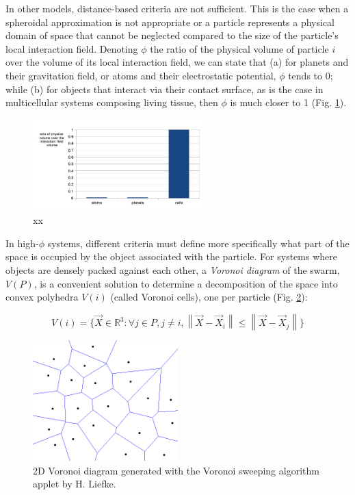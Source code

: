 In other models, distance-based criteria are not sufficient. This is the case when a spheroidal approximation is not appropriate or a particle represents a physical domain of space that cannot be neglected compared to the size of the particle's local interaction field. Denoting $\phi$ the ratio of the physical volume of particle $i$ over the volume of its local interaction field, we can state that (a) for planets and their gravitation field, or atoms and their electrostatic potential, $\phi$ tends to 0; while (b) for objects that interact via their contact surface, as is the case in multicellular systems composing living tissue, then $\phi$ is much closer to 1 (Fig. \ref{spatial_neighb_field_volume_ratio}).
\begin{figure}
\begin{center}
\includegraphics[width=0.6\textwidth]{../../images/MECAGEN/spatial_neighb/field_volume_ratio.png}
\end{center}
\caption{xx}
\label{spatial_neighb_field_volume_ratio}
\end{figure}

In high-$\phi$ systems, different criteria must define more specifically what part of the space is occupied by the object associated with the particle. For systems where objects are densely packed against each other, a \textit{Voronoi diagram} of the swarm, $V(P)$, is a convenient solution to determine a decomposition of the space into convex polyhedra $V(i)$ (called Voronoi cells), one per particle (Fig. \ref{spatial_neighb_voronoi}):

$$V(i) = \{\vec{X} \in \mathbb{R}^{3}: \forall j \in P, j \neq i, \left\|\vec{X} - \vec{X}_i\right\| \leq \left\|\vec{X} - \vec{X}_j\right\|\}$$
\begin{figure}
\begin{center}
\includegraphics[width=0.5\textwidth]{../../images/MECAGEN/spatial_neighb/voronoi.png}
\end{center}
\caption{2D Voronoi diagram generated with the Voronoi sweeping algorithm applet by H. Liefke.}
\label{spatial_neighb_voronoi}
\end{figure}

